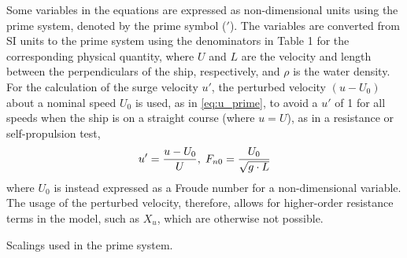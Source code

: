 \noindent Some variables in the equations are expressed as non-dimensional units using the prime system, denoted by the prime symbol ($'$). The variables are converted from SI units to the prime system using the denominators in Table 1 for the corresponding physical quantity, where $U$ and $L$ are the velocity and length between the perpendiculars of the ship, respectively, and $\rho$ is the water density.
For the calculation of the surge velocity $u'$, the perturbed velocity $(u-U_0)$ about a nominal speed $U_0$ is used, as in  \autoref{eq:u_prime}, to avoid a $u'$ of 1 for all speeds when the ship is on a straight course (where $u=U$), as in a resistance or self-propulsion test, 
\begin{equation}
    \label{eq:u_prime}
    u' = \frac{u-U_0}{U}, \hspace{0.1cm}
    F_{n0} = \frac{U_0}{\sqrt{g \cdot L}}
\end{equation}
where $U_0$ is instead expressed as a Froude number for a non-dimensional variable.
The usage of the perturbed velocity, therefore, allows for higher-order resistance terms in the model, such as $X_{u}$, which are otherwise not possible. 
\begin{table}[h]\label{tab:prime_system}
    \caption{Scalings used in the prime system.}
    \centering
\end{table}
